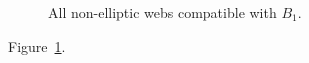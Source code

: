 \documentclass{article}
\begin{document}
\begin{figure}[ht]\centering{}
\caption{All non-elliptic webs compatible with $B_1$.}\label{fig:minimal}
\end{figure}
Figure~\ref{fig:minimal}.
\end{document}
